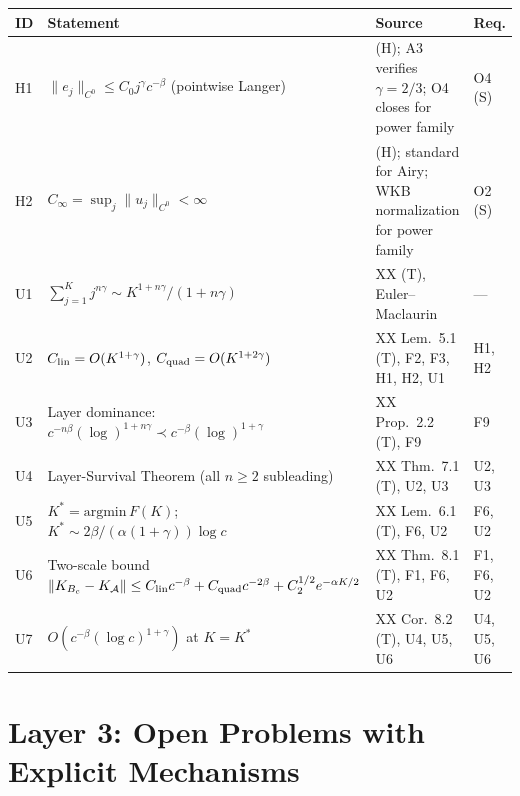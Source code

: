 \documentclass[12pt,a4paper]{amsart}
\theoremstyle{definition}
\begin{document}
\begin{center}
\renewcommand{\arraystretch}{1.3}
\begin{tabular}{l p{5.0cm} l l}
\toprule
\textbf{ID} & \textbf{Statement} & \textbf{Source} & \textbf{Req.} \\
\midrule
H1 & $\|e_j\|_{C^0}\leq C_0 j^\gamma c^{-\beta}$
  (pointwise Langer)
  & (H); A3 verifies $\gamma=2/3$;
    O4 closes for power family
  & O4 (S) \\
H2 & $C_\infty = \sup_j\|u_j\|_{C^0}<\infty$
  & (H); standard for Airy;
    WKB normalization for power family
  & O2 (S) \\
U1 & $\sum_{j=1}^K j^{n\gamma}\sim K^{1+n\gamma}/(1+n\gamma)$
  & XX (T), Euler--Maclaurin
  & --- \\
U2 & $C_{\rm lin}=O(K^{1+\gamma})$,
    $C_{\rm quad}=O(K^{1+2\gamma})$
  & XX Lem.~5.1 (T), F2, F3, H1, H2, U1
  & H1, H2 \\
U3 & Layer dominance:
    $c^{-n\beta}(\log)^{1+n\gamma}\prec c^{-\beta}(\log)^{1+\gamma}$
  & XX Prop.~2.2 (T), F9
  & F9 \\
U4 & Layer-Survival Theorem (all $n\geq 2$ subleading)
  & XX Thm.~7.1 (T), U2, U3
  & U2, U3 \\
U5 & $K^* = \mathrm{argmin}\,F(K)$;
    $K^*\sim 2\beta/(\alpha(1+\gamma))\log c$
  & XX Lem.~6.1 (T), F6, U2
  & F6, U2 \\
U6 & Two-scale bound
    $\|K_{B_c}-K_\mathcal{A}\|\leq C_{\rm lin}c^{-\beta}
    +C_{\rm quad}c^{-2\beta}+C_2^{1/2}e^{-\alpha K/2}$
  & XX Thm.~8.1 (T), F1, F6, U2
  & F1, F6, U2 \\
U7 & $O(c^{-\beta}(\log c)^{1+\gamma})$ at $K=K^*$
  & XX Cor.~8.2 (T), U4, U5, U6
  & U4, U5, U6 \\
\bottomrule
\end{tabular}
\end{center}

\section{Layer 3: Open Problems with Explicit Mechanisms}
\label{sec:L3}
\end{document}
